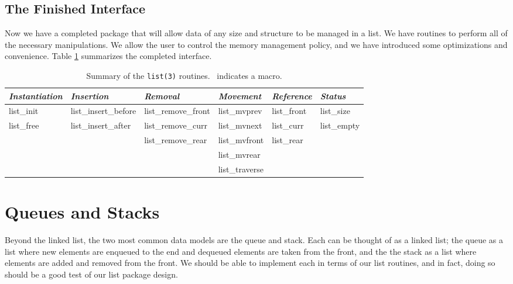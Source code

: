 \documentclass[fullpage,11pt]{article}
\begin{document}
\subsection{The Finished Interface}
Now we have a completed package that will allow data of any size and structure
to be managed in a list.  We have routines to perform all of the necessary
manipulations.  We allow the user to control the memory management policy,
and we have introduced some optimizations and convenience.  Table
\ref{interface} summarizes the completed interface.
\begin{table}[h]
\begin{centering}
\begin{tabular}{|l|l|l|l|l|l|} \hline
{\em Instantiation} & {\em Insertion} & {\em Removal} & {\em Movement}
& {\em Reference} & {\em Status} \\ \hline

list\_init & list\_insert\_before & list\_remove\_front &
	list\_mvprev   & list\_front\dag & list\_size\dag \\
list\_free & list\_insert\_after  & list\_remove\_curr  &
	list\_mvnext   & list\_curr\dag  & list\_empty\dag \\
           &                      & list\_remove\_rear &
	list\_mvfront\dag  & list\_rear\dag  &             \\
           &                      &                    &
	list\_mvrear\dag   &             &             \\
           &                      &                    &
	list\_traverse &             &             \\ \hline
\end{tabular}
\caption{Summary of the {\tt list(3)} routines. \dag \ indicates a macro.}
\label{interface}
\end{centering}
\end{table}

\section{Queues and Stacks}
Beyond the linked list, the two most common data models are the queue and
stack.  Each can be thought of as a linked list; the queue as a list where new
elements are enqueued to the end and dequeued elements are taken from the
front, and the the stack as a list where elements are added and removed from
the front.  We should be able to implement each in terms of our list routines,
and in fact, doing so should be a good test of our list package design.
\end{document}
